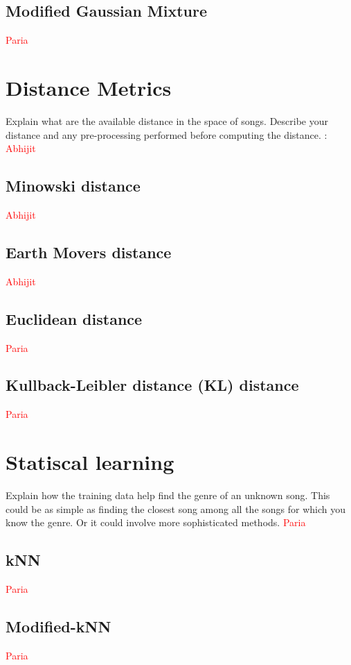 \documentclass[12pt]{article}
\begin{document}
\subsection{Modified Gaussian Mixture} \textcolor{red}{Paria}

\section{Distance Metrics}
Explain what are the available distance in the space of songs.
Describe your distance and any pre-processing performed before
computing the distance. : \textcolor{red}{Abhijit}
\subsection{Minowski distance}\textcolor{red}{Abhijit}
\subsection{Earth Movers distance}\textcolor{red}{Abhijit}
\subsection{Euclidean distance}\textcolor{red}{Paria}
\subsection{Kullback-Leibler distance (KL) distance}\textcolor{red}{Paria}

\section{Statiscal learning}
Explain how the training data help find the genre of an unknown
song. This could be as simple as finding the closest song among all
the songs for which you know the genre. Or it could involve more
sophisticated methods. \textcolor{red}{Paria}

\subsection{kNN}\textcolor{red}{Paria}

\subsection{Modified-kNN}\textcolor{red}{Paria}
\end{document}
